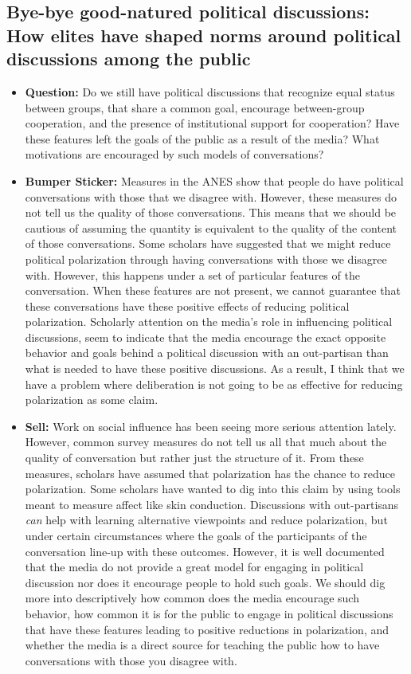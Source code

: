 \documentclass[12pt]{article}
\begin{document}
\subsection{Bye-bye good-natured political discussions: How elites have shaped norms around political discussions among the public}
    \begin{itemize}
        \item \textbf{Question:} Do we still have political discussions that recognize equal status between groups, that share a common goal, encourage between-group cooperation, and the presence of institutional support for cooperation? Have these features left the goals of the public as a result of the media? What motivations are encouraged by such models of conversations?
        \item \textbf{Bumper Sticker:} Measures in the ANES show that people do have political conversations with those that we disagree with. However, these measures do not tell us the quality of those conversations. This means that we should be cautious of assuming the quantity is equivalent to the quality of the content of those conversations. Some scholars have suggested that we might reduce political polarization through having conversations with those we disagree with. However, this happens under a set of particular features of the conversation. When these features are not present, we cannot guarantee that these conversations have these positive effects of reducing political polarization. Scholarly attention on the media's role in influencing political discussions, seem to indicate that the media encourage the exact opposite behavior and goals behind a political discussion with an out-partisan than what is needed to have these positive discussions. As a result, I think that we have a problem where deliberation is not going to be as effective for reducing polarization as some claim.
        \item \textbf{Sell:} Work on social influence has been seeing more serious attention lately. However, common survey measures do not tell us all that much about the quality of conversation but rather just the structure of it. From these measures, scholars have assumed that polarization has the chance to reduce polarization. Some scholars have wanted to dig into this claim by using tools meant to measure affect like skin conduction. Discussions with out-partisans \textit{can} help with learning alternative viewpoints and reduce polarization, but under certain circumstances where the goals of the participants of the conversation line-up with these outcomes. However, it is well documented that the media do not provide a great model for engaging in political discussion nor does it encourage people to hold such goals. We should dig more into descriptively how common does the media encourage such behavior, how common it is for the public to engage in political discussions that have these features leading to positive reductions in polarization, and whether the media is a direct source for teaching the public how to have conversations with those you disagree with.

\end{itemize}
\end{document}
